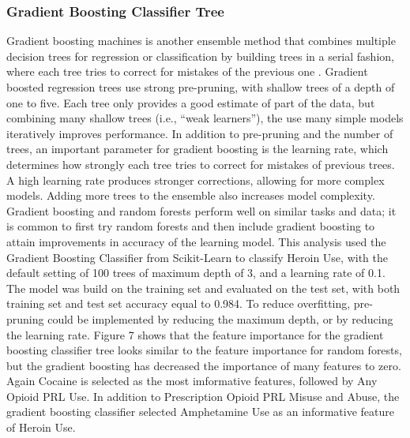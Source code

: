 \documentclass[sigconf]{acmart}
\begin{document}
\subsubsection{Gradient Boosting Classifier Tree}

Gradient boosting machines is another ensemble method that combines multiple
decision trees for regression or classification by building trees in a serial 
fashion, where each tree tries to correct for mistakes of the previous one
\cite{muller17}. Gradient boosted regression trees use strong pre-pruning, 
with shallow trees of a depth of one to five. Each tree only provides a good
estimate of part of the data, but combining many shallow trees (i.e., ``weak 
learners''), the use many simple models iteratively improves performance. In 
addition to pre-pruning and the number of trees, an important parameter for 
gradient boosting is the learning rate, which determines how strongly each
tree tries to correct for mistakes of previous trees. A high learning rate
produces stronger corrections, allowing for more complex models. Adding
more trees to the ensemble also increases model complexity. Gradient boosting
and random forests perform well on similar tasks and data; it is common to
first try random forests and then include gradient boosting to attain 
improvements in accuracy of the learning model. This analysis used the 
Gradient Boosting Classifier from Scikit-Learn to classify Heroin Use, with 
the default setting of 100 trees of maximum depth of 3, and a learning rate 
of 0.1. The model was build on the training set and evaluated on the test set, 
with both training set and test set accuracy equal to 0.984. To reduce
overfitting, pre-pruning could be implemented by reducing the maximum depth, 
or by reducing the learning rate. Figure 7 shows that the feature importance 
for the gradient boosting classifier tree looks similar to the feature 
importance for random forests, but the gradient boosting has decreased the 
importance of many features to zero. Again Cocaine is selected as the most 
imformative features, followed by Any Opioid PRL Use. In addition to 
Prescription Opioid PRL Misuse and Abuse, the gradient boosting classifier 
selected Amphetamine Use as an informative feature of Heroin Use. 
\end{document}
